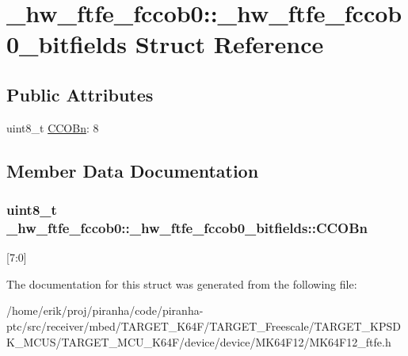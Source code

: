 \hypertarget{struct__hw__ftfe__fccob0_1_1__hw__ftfe__fccob0__bitfields}{}\section{\+\_\+hw\+\_\+ftfe\+\_\+fccob0\+:\+:\+\_\+hw\+\_\+ftfe\+\_\+fccob0\+\_\+bitfields Struct Reference}
\label{struct__hw__ftfe__fccob0_1_1__hw__ftfe__fccob0__bitfields}
\subsection*{Public Attributes}
\begin{DoxyCompactItemize}
\item 
uint8\+\_\+t \hyperlink{struct__hw__ftfe__fccob0_1_1__hw__ftfe__fccob0__bitfields_a181c0eaf277439da5e7d61e9981149bc}{C\+C\+O\+Bn}\+: 8
\end{DoxyCompactItemize}


\subsection{Member Data Documentation}
\subsubsection[{\texorpdfstring{C\+C\+O\+Bn}{CCOBn}}]{\setlength{\rightskip}{0pt plus 5cm}uint8\+\_\+t \+\_\+hw\+\_\+ftfe\+\_\+fccob0\+::\+\_\+hw\+\_\+ftfe\+\_\+fccob0\+\_\+bitfields\+::\+C\+C\+O\+Bn}\hypertarget{struct__hw__ftfe__fccob0_1_1__hw__ftfe__fccob0__bitfields_a181c0eaf277439da5e7d61e9981149bc}{}\label{struct__hw__ftfe__fccob0_1_1__hw__ftfe__fccob0__bitfields_a181c0eaf277439da5e7d61e9981149bc}
\mbox{[}7\+:0\mbox{]} 

The documentation for this struct was generated from the following file\+:\begin{DoxyCompactItemize}
\item 
/home/erik/proj/piranha/code/piranha-\/ptc/src/receiver/mbed/\+T\+A\+R\+G\+E\+T\+\_\+\+K64\+F/\+T\+A\+R\+G\+E\+T\+\_\+\+Freescale/\+T\+A\+R\+G\+E\+T\+\_\+\+K\+P\+S\+D\+K\+\_\+\+M\+C\+U\+S/\+T\+A\+R\+G\+E\+T\+\_\+\+M\+C\+U\+\_\+\+K64\+F/device/device/\+M\+K64\+F12/M\+K64\+F12\+\_\+ftfe.\+h\end{DoxyCompactItemize}
